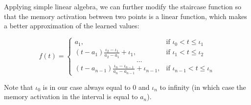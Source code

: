 Applying simple linear algebra, we can further modify the staircase function so that the memory activation between two points is a linear function, which makes a better approximation of the learned values:

\begin{equation} \label{eq-staircase-2}
  f(t) = \begin{cases}
            a_1, & \text{if } \iota_0 < t \leq \iota_1 \\
            (t - a_1) \frac{\iota_2 - \iota_1}{a_2 - a_1} + \iota_1, & \text{if } \iota_1 < t \leq \iota_2 \\
            \hspace{9em} \dots \\
            (t - a_{n-1}) \frac{\iota_n - \iota_{n-1}}{a_n - a_{n-1}} + \iota_{n-1}, & \text{if } \iota_{n-1} < t \leq \iota_n     
         \end{cases}
\end{equation}

Note that $\iota_0$ is in our case always equal to $0$ and $\iota_n$ to infinity (in which case the memory activation in the interval is equal to $a_n$).
